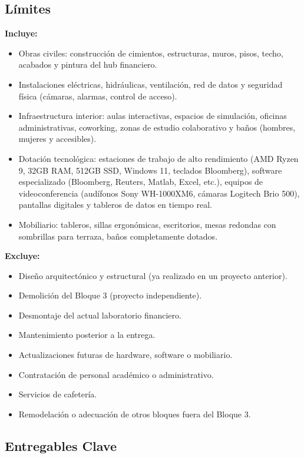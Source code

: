 \subsection{Límites}

\textbf{Incluye:}
\begin{itemize}
    \item Obras civiles: construcción de cimientos, estructuras, muros, pisos, techo, acabados y pintura del hub financiero.
    \item Instalaciones eléctricas, hidráulicas, ventilación, red de datos y seguridad física (cámaras, alarmas, control de acceso).
    \item Infraestructura interior: aulas interactivas, espacios de simulación, oficinas administrativas, coworking, zonas de estudio colaborativo y baños (hombres, mujeres y accesibles).
    \item Dotación tecnológica: estaciones de trabajo de alto rendimiento (AMD Ryzen 9, 32GB RAM, 512GB SSD, Windows 11, teclados Bloomberg), software especializado (Bloomberg, Reuters, Matlab, Excel, etc.), equipos de videoconferencia (audífonos Sony WH-1000XM6, cámaras Logitech Brio 500), pantallas digitales y tableros de datos en tiempo real.
    \item Mobiliario: tableros, sillas ergonómicas, escritorios, mesas redondas con sombrillas para terraza, baños completamente dotados.
\end{itemize}

\textbf{Excluye:}
\begin{itemize}
    \item Diseño arquitectónico y estructural (ya realizado en un proyecto anterior).
    \item Demolición del Bloque 3 (proyecto independiente).
    \item Desmontaje del actual laboratorio financiero.
    \item Mantenimiento posterior a la entrega.
    \item Actualizaciones futuras de hardware, software o mobiliario.
    \item Contratación de personal académico o administrativo.
    \item Servicios de cafetería.
    \item Remodelación o adecuación de otros bloques fuera del Bloque 3.
\end{itemize}

\subsection{Entregables Clave}

